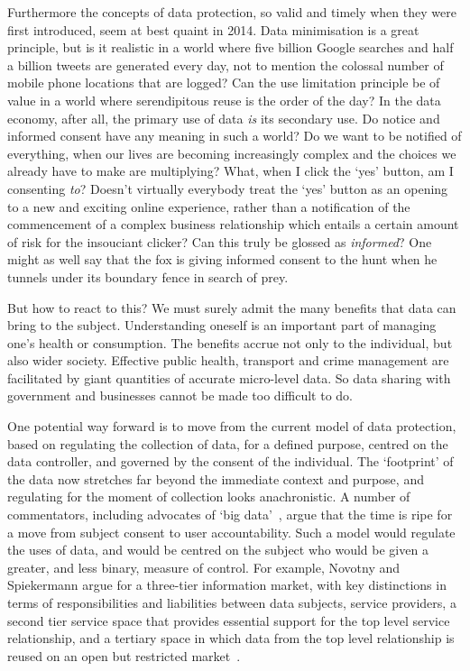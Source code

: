 \documentclass[graybox]{svmult}
\begin{document}
Furthermore the concepts of data protection, so valid and timely when they were first introduced, seem at best quaint in 2014. Data minimisation is a great principle, but is it realistic in a world where five billion Google searches and half a billion tweets are generated every day, not to mention the colossal number of mobile phone locations that are logged? Can the use limitation principle be of value in a world where serendipitous reuse is the order of the day? In the data economy, after all, the primary use of data {\em is} its secondary use. Do notice and informed consent have any meaning in such a world? Do we want to be notified of everything, when our lives are becoming increasingly complex and the choices we already have to make are multiplying? What, when I click the `yes’ button, am I consenting {\em to}? Doesn’t virtually everybody treat the `yes’ button as an opening to a new and exciting online experience, rather than a notification of the commencement of a complex business relationship which entails a certain amount of risk for the insouciant clicker? Can this truly be glossed as {\em informed}? One might as well say that the fox is giving informed consent to the hunt when he tunnels under its boundary fence in search of prey.

But how to react to this? We must surely admit the many benefits that data can bring to the subject. Understanding oneself is an important part of managing one's health or consumption. The benefits accrue not only to the individual, but also wider society. Effective public health, transport and crime management are facilitated by giant quantities of accurate micro-level data. So data sharing with government and businesses cannot be made too difficult to do.

One potential way forward is to move from the current model of data protection, based on regulating the collection of data, for a defined purpose, centred on the data controller, and governed by the consent of the individual. The `footprint’ of the data now stretches far beyond the immediate context and purpose, and regulating for the moment of collection looks anachronistic. A number of commentators, including advocates of `big data’~\cite{mayer-schonberger2013}, argue that the time is ripe for a move from subject consent to user accountability. Such a model would regulate the uses of data, and would be centred on the subject who would be given a greater, and less binary, measure of control. For example, Novotny and Spiekermann argue for a three-tier information market, with key distinctions in terms of responsibilities and liabilities between data subjects, service providers, a second tier service space that provides essential support for the top level service relationship, and a tertiary space in which data from the top level relationship is reused on an open but restricted market~\cite{novotny2013}.
\end{document}
